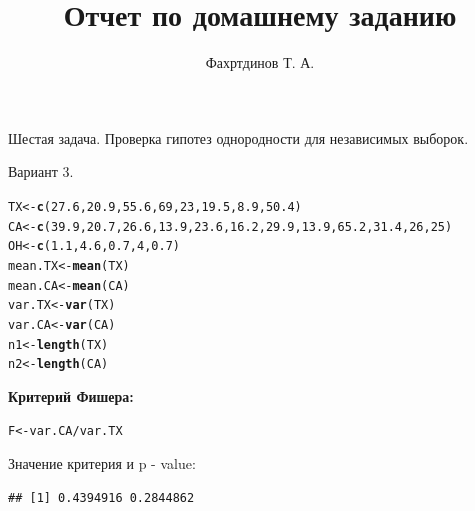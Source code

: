 \documentclass{article}\usepackage[]{graphicx}\usepackage[]{color}
\makeatletter
\newcommand{\hlnum}[1]{\textcolor[rgb]{0.686,0.059,0.569}{#1}}%
\newcommand{\hlopt}[1]{\textcolor[rgb]{0,0,0}{#1}}%
\newcommand{\hlstd}[1]{\textcolor[rgb]{0.345,0.345,0.345}{#1}}%
\newcommand{\hlkwb}[1]{\textcolor[rgb]{0.69,0.353,0.396}{#1}}%
\newcommand{\hlkwd}[1]{\textcolor[rgb]{0.737,0.353,0.396}{\textbf{#1}}}%
\newenvironment{kframe}{%
 \def\at@end@of@kframe{}%
 \ifinner\ifhmode%
  \def\at@end@of@kframe{\end{minipage}}%
  \begin{minipage}{\columnwidth}%
 \fi\fi%
 \def\FrameCommand##1{\hskip\@totalleftmargin \hskip-\fboxsep
 \colorbox{shadecolor}{##1}\hskip-\fboxsep
     \hskip-\linewidth \hskip-\@totalleftmargin \hskip\columnwidth}%
 \MakeFramed {\advance\hsize-\width
   \@totalleftmargin\z@ \linewidth\hsize
   \@setminipage}}%
 {\par\unskip\endMakeFramed%
 \at@end@of@kframe}
\newenvironment{knitrout}{}{} %
\makeatother
\begin{document}
\title{Отчет по домашнему заданию}
\pretitle{\vspace{\droptitle}\centering\huge}
\posttitle{\par}
\author{Фахртдинов Т. А.}


\maketitle
Шестая задача. Проверка гипотез однородности для независимых
выборок.

Вариант 3.

\begin{knitrout}
\color{fgcolor}\begin{kframe}
\begin{alltt}
\hlstd{TX} \hlkwb{<-} \hlkwd{c}\hlstd{(}\hlnum{27.6}\hlstd{,} \hlnum{20.9}\hlstd{,} \hlnum{55.6}\hlstd{,} \hlnum{69}\hlstd{,} \hlnum{23}\hlstd{,} \hlnum{19.5}\hlstd{,} \hlnum{8.9}\hlstd{,} \hlnum{50.4}\hlstd{)}
\hlstd{CA} \hlkwb{<-} \hlkwd{c}\hlstd{(}\hlnum{39.9}\hlstd{,} \hlnum{20.7}\hlstd{,} \hlnum{26.6}\hlstd{,} \hlnum{13.9}\hlstd{,} \hlnum{23.6}\hlstd{,} \hlnum{16.2}\hlstd{,} \hlnum{29.9}\hlstd{,} \hlnum{13.9}\hlstd{,} \hlnum{65.2}\hlstd{,} \hlnum{31.4}\hlstd{,} \hlnum{26}\hlstd{,} \hlnum{25}\hlstd{)}
\hlstd{OH} \hlkwb{<-} \hlkwd{c}\hlstd{(}\hlnum{1.1}\hlstd{,} \hlnum{4.6}\hlstd{,} \hlnum{0.7}\hlstd{,} \hlnum{4}\hlstd{,} \hlnum{0.7}\hlstd{)}
\hlstd{mean.TX} \hlkwb{<-} \hlkwd{mean}\hlstd{(TX)}
\hlstd{mean.CA} \hlkwb{<-} \hlkwd{mean}\hlstd{(CA)}
\hlstd{var.TX} \hlkwb{<-} \hlkwd{var}\hlstd{(TX)}
\hlstd{var.CA} \hlkwb{<-} \hlkwd{var}\hlstd{(CA)}
\hlstd{n1} \hlkwb{<-} \hlkwd{length}\hlstd{(TX)}
\hlstd{n2} \hlkwb{<-} \hlkwd{length}\hlstd{(CA)}
\end{alltt}
\end{kframe}
\end{knitrout}


\textbf{Критерий Фишера:}
\begin{knitrout}
\color{fgcolor}\begin{kframe}
\begin{alltt}
\hlstd{F} \hlkwb{<-} \hlstd{var.CA} \hlopt{/} \hlstd{var.TX}
\end{alltt}
\end{kframe}
\end{knitrout}
Значение критерия и p - value:
\begin{knitrout}
\color{fgcolor}\begin{kframe}
\begin{verbatim}
## [1] 0.4394916 0.2844862
\end{verbatim}
\end{kframe}
\end{knitrout}
\end{document}
